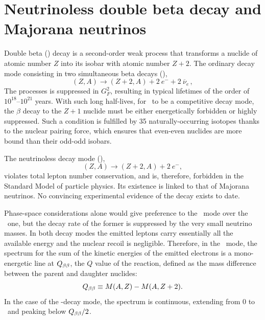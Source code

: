 \section{Neutrinoless double beta decay and Majorana neutrinos}
\label{sec:bbonu}
Double beta (\bb) decay is a second-order weak process that transforms a nuclide of atomic number $Z$ into its isobar with atomic number $Z+2$. The ordinary decay mode consisting in two simultaneous beta decays (\bbtnu),
\begin{equation}
(Z,A) \to (Z+2,A) + 2~e^{-} + 2~\overline{\nu}_{e}\, ,
\end{equation}
The processes is suppressed in $G_F^2$, resulting in typical lifetimes of the order of $10^{18}$--$10^{21}$ years. With such long half-lives, for \bbtnu\ to be a competitive decay mode, the $\beta$ decay to the $Z+1$ nuclide must be either energetically forbidden or highly suppressed. Such a condition is fulfilled by 35 naturally-occurring isotopes thanks to the nuclear pairing force, which ensures that even-even nuclides are more bound than their odd-odd isobars.

The neutrinoless decay mode (\bbonu),
\begin{equation}
(Z,A) \rightarrow (Z+2,A) + 2\ e^{-}, \label{eq:bb0nu}
\end{equation}
violates total lepton number conservation, and is, therefore, forbidden in the Standard Model of particle physics. Its existence is linked to that of Majorana neutrinos. No convincing experimental evidence of the decay exists to date. 

Phase-space considerations alone would give preference to the \bbonu\ mode over the \bbtnu\ one, but the decay rate of the former is suppressed by the very small neutrino masses. In both decay modes the emitted leptons carry essentially all the available energy and the nuclear recoil is negligible. Therefore, in the \bbonu\ mode, the spectrum for the sum of the kinetic energies of the emitted electrons is a mono-energetic line at $Q_{\beta\beta}$, the $Q$ value of the reaction, defined as the mass difference between the parent and daughter nuclides:
\begin{equation}
Q_{\beta\beta} \equiv M(A, Z) - M(A, Z+2).
\end{equation}
In the case of the \bbtnu-decay mode, the spectrum is continuous, extending from 0 to \Qbb\ and peaking below $Q_{\beta\beta}/2$.

